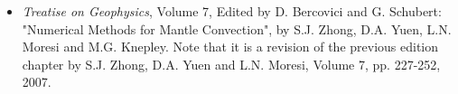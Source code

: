 
\begin{itemize} 
\item {\it Treatise on Geophysics}, Volume 7, Edited by D. Bercovici and G. Schubert: 
"Numerical Methods for Mantle Convection", by S.J. Zhong, D.A. Yuen, L.N. Moresi and M.G. Knepley. Note that it is a revision of the previous edition chapter by S.J. Zhong, D.A. Yuen and L.N. Moresi, Volume 7, pp. 227-252, 2007.

\end{itemize}
